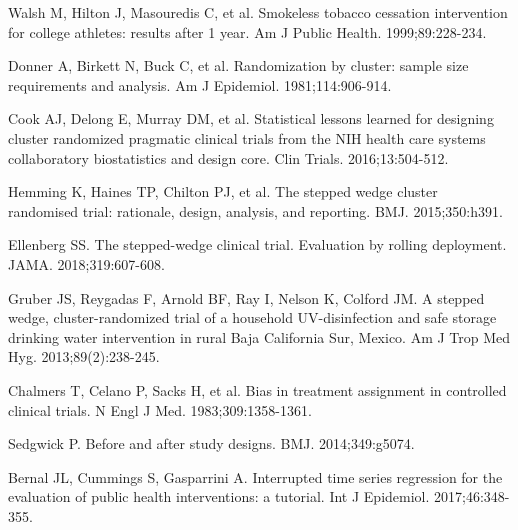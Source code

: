 \begin{references}
\item Walsh M, Hilton J, Masouredis C, et al. Smokeless tobacco cessation intervention for college athletes: results after 1 year. Am J Public Health. 1999;89:228-234.
\item Donner A, Birkett N, Buck C, et al. Randomization by cluster: sample size requirements and analysis. Am J Epidemiol. 1981;114:906-914.
\item Cook AJ, Delong E, Murray DM, et al. Statistical lessons learned for designing cluster randomized pragmatic clinical trials from the NIH health care systems collaboratory biostatistics and design core. Clin Trials. 2016;13:504-512.
\item Hemming K, Haines TP, Chilton PJ, et al. The stepped wedge cluster randomised trial: rationale, design, analysis, and reporting. BMJ. 2015;350:h391.
\item Ellenberg SS. The stepped-wedge clinical trial. Evaluation by rolling deployment. JAMA. 2018;319:607-608.
\item Gruber JS, Reygadas F, Arnold BF, Ray I, Nelson K, Colford JM. A stepped wedge, cluster-randomized trial of a household UV-disinfection and safe storage drinking water intervention in rural Baja California Sur, Mexico. Am J Trop Med Hyg. 2013;89(2):238-245.
\item Chalmers T, Celano P, Sacks H, et al. Bias in treatment assignment in controlled clinical trials. N Engl J Med. 1983;309:1358-1361.
\item Sedgwick P. Before and after study designs. BMJ. 2014;349:g5074.
\item Bernal JL, Cummings S, Gasparrini A. Interrupted time series regression for the evaluation of public health interventions: a tutorial. Int J Epidemiol. 2017;46:348-355.
\end{references}
